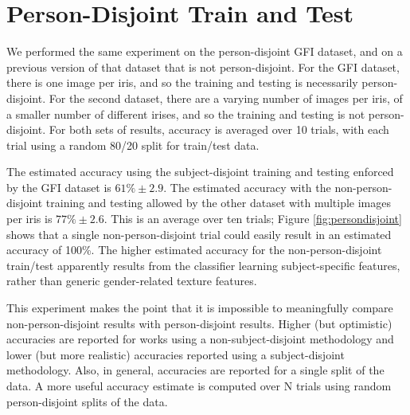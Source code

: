 \documentclass[10pt,twocolumn,letterpaper]{article}
\begin{document}
\section{Person-Disjoint Train and Test}
\label{method_aspects}

We performed the same experiment on the person-disjoint GFI dataset, and on a previous version of that dataset that is not person-disjoint.
For the GFI dataset, there is one image per iris, and so the training and testing is necessarily person-disjoint.
For the second dataset, there are a varying number of images per iris, of a smaller number of different irises, and so the training and testing is not person-disjoint.
For both sets of results, accuracy is averaged over 10 trials, with each trial using a random 80/20 split for train/test data.

The estimated accuracy using the subject-disjoint training and testing enforced by the GFI dataset is $61\% \pm 2.9$.
The estimated accuracy with the non-person-disjoint training and testing allowed by the other dataset with multiple images per iris is $77\% \pm 2.6$.
This is an average over ten trials; Figure \ref{fig:persondisjoint} shows that a single non-person-disjoint trial could easily result in an estimated accuracy of 100\%.
The higher estimated accuracy for the non-person-disjoint train/test apparently results from the classifier learning subject-specific features, rather than generic gender-related texture features.

This experiment makes the point that it is impossible to meaningfully compare non-person-disjoint results with person-disjoint results.
Higher (but optimistic) accuracies are reported for works using a non-subject-disjoint methodology and lower (but more realistic) accuracies reported using a subject-disjoint methodology.
Also, in general, accuracies are reported for a single split of the data.
A more useful accuracy estimate is computed over N trials using random person-disjoint splits of the data.
\end{document}
